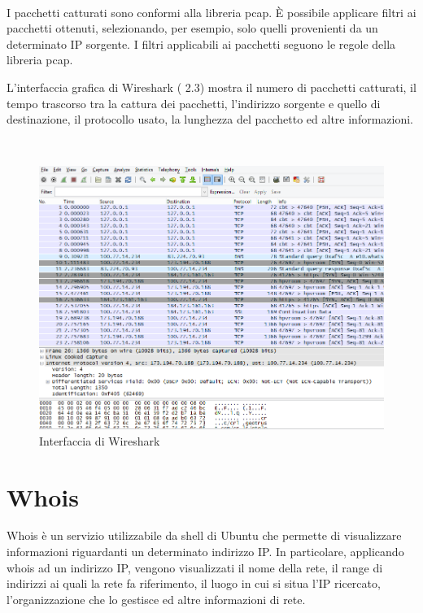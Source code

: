 \documentclass[a4paper,11pt]{book}
\begin{document}
~

I pacchetti catturati sono conformi alla libreria pcap. \`E possibile applicare filtri ai pacchetti ottenuti, selezionando, per esempio, solo quelli provenienti da un determinato IP sorgente. I filtri applicabili ai pacchetti seguono le regole della libreria pcap.

L'interfaccia grafica di Wireshark (\figurename \hspace{0.2cm} 2.3) mostra il numero di pacchetti catturati, il tempo trascorso tra la cattura dei pacchetti, l'indirizzo sorgente e quello di destinazione, il protocollo usato, la lunghezza del pacchetto ed altre informazioni.

~

\begin{figure}[!ht]
\centering
\includegraphics[scale = 0.5]{Whireshark}
\caption{Interfaccia di Wireshark}
\end{figure}

\clearpage

\section{Whois}
Whois \`e un servizio utilizzabile da shell di Ubuntu che permette di visualizzare informazioni riguardanti un determinato indirizzo IP.
In particolare, applicando whois ad un indirizzo IP, vengono visualizzati il nome della rete, il range di indirizzi ai quali la rete fa riferimento, il luogo in cui si situa l'IP ricercato, l'organizzazione che lo gestisce ed altre informazioni di rete.

~
\end{document}
